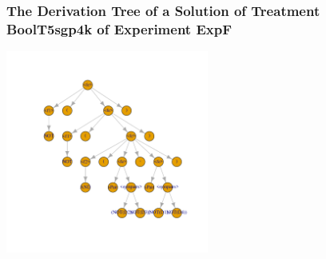  \begin{frame}
 \frametitle{ The Derivation Tree of a Solution of Treatment BoolT5sgp4k of Experiment ExpF }
 \begin{center}
\includegraphics[width=0.5\textwidth, angle=0]
{ExpFDerivationTreeFigure005.pdf}
 \end{center}
 \label{report/ExpFDerivationTreeFigure005.pdf}  
 \end{frame}

